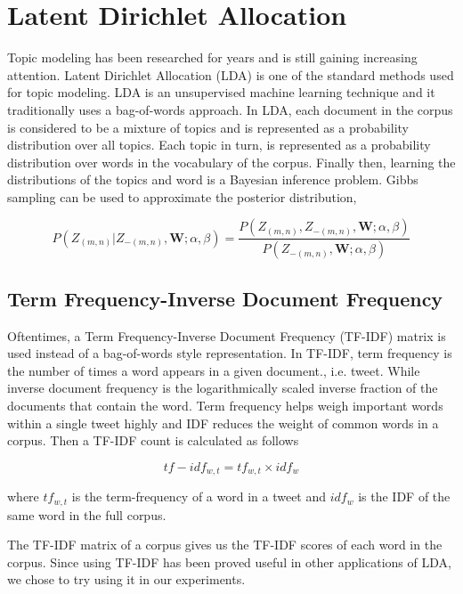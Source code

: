 \documentclass[12pt]{amsart}
\newcommand{\0}{\mat{0}}
\newcommand{\1}{\mathds{1}}
\begin{document}
\section{Latent Dirichlet Allocation}
Topic modeling has been researched for years and is still gaining increasing attention. Latent Dirichlet Allocation (LDA) is one of the standard methods used for topic modeling. LDA is an unsupervised machine learning technique and it traditionally uses a bag-of-words approach. In LDA, each document in the corpus is considered to be a mixture of topics and is represented as a probability distribution over all topics. Each topic in turn, is represented as a probability distribution over words in the vocabulary of the corpus. Finally then, learning the distributions of the topics and word is a Bayesian inference problem. Gibbs sampling can be used to approximate the posterior distribution, 

$$ P( Z_{(m,n)} | Z_{-(m,n)}, \pmb{W}; \alpha, \beta) = \frac{P(Z_{(m,n)}, Z_{-(m,n)}, \pmb{W}; \alpha, \beta)}{P(Z_{-(m,n)}, \pmb{W}; \alpha, \beta)} $$

\subsection{Term Frequency-Inverse Document Frequency}
Oftentimes, a Term Frequency-Inverse Document Frequency (TF-IDF) matrix is used instead of a bag-of-words style representation. In TF-IDF, term frequency is the number of times a word appears in a given document., i.e. tweet. While inverse document frequency is the logarithmically scaled inverse fraction of the documents that contain the word. Term frequency helps weigh important words within a single tweet highly and IDF reduces the weight of common words in a corpus. Then a TF-IDF count is calculated as follows

$$ tf-idf_{w,t} = tf_{w,t} \times idf_{w}  $$

where $tf_{w,t}$ is the term-frequency of a word in a tweet and $idf_w$ is the IDF of the same word in the full corpus.

The TF-IDF matrix of a corpus gives us the TF-IDF scores of each word in the corpus. Since using TF-IDF has been proved useful in other applications of LDA, we chose to try using it in our experiments. 
\end{document}
